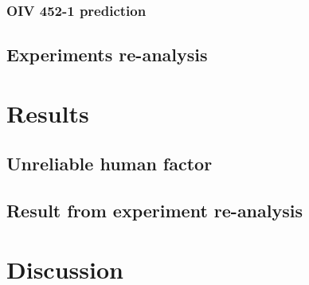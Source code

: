 \documentclass[english]{article}
\begin{document}
\subsubsection{OIV 452-1 prediction}

\subsection{Experiments re-analysis}

\section{Results}

\subsection{Unreliable human factor}

\subsection{Result from experiment re-analysis}

\section{Discussion}

\printbibliography
\end{document}

